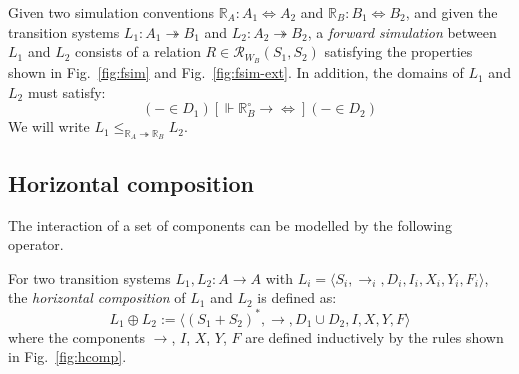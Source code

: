 \documentclass[acmsmall,authordraft]{acmart}
\newcommand{\ifr}[1]{\mathrel{[{#1}]}}
\newcommand{\que}{\circ}
\begin{document}
\begin{definition} \label{def:sim} %
Given
two simulation conventions
$\mathbb{R}_A : A_1 \Leftrightarrow A_2$ and
$\mathbb{R}_B : B_1 \Leftrightarrow B_2$,
and given
the transition systems
$L_1 : A_1 \twoheadrightarrow B_1$ and
$L_2 : A_2 \twoheadrightarrow B_2$,
a \emph{forward simulation} between $L_1$ and $L_2$
consists of a relation
$R \in \mathcal{R}_{W_B}(S_1, S_2)$
satisfying the properties shown in
Fig.~\ref{fig:fsim} and Fig.~\ref{fig:fsim-ext}.
In addition, the domains of $L_1$ and $L_2$
must satisfy:
\[
  ({-} \in D_1)
  \ifr{\Vdash \mathbb{R}_B^\que \rightarrow {\Leftrightarrow}}
  ({-} \in D_2)
\]
We will write $L_1 \le_{\mathbb{R}_A \twoheadrightarrow \mathbb{R}_B} L_2$.
\end{definition}


\subsection{Horizontal composition} \label{sec:sem:linker} %

The interaction of a set of components
can be modelled by the following operator.

\begin{definition} \label{def:hcomp} %
For two transition systems $L_1, L_2 : A \rightarrow A$
with
$L_i = \langle S_i, {\rightarrow}_i, D_i, I_i, X_i, Y_i, F_i \rangle$,
the \emph{horizontal composition} of $L_1$ and $L_2$
is defined as:
\[
    L_1 \oplus L_2 :=
    \langle
      (S_1 + S_2)^*, {\rightarrow}, D_1 \cup D_2, I, X, Y, F
    \rangle
\]
where the components $\rightarrow$, $I$, $X$, $Y$, $F$
are defined inductively by
the rules shown in Fig.~\ref{fig:hcomp}.
\end{definition}
\end{document}
